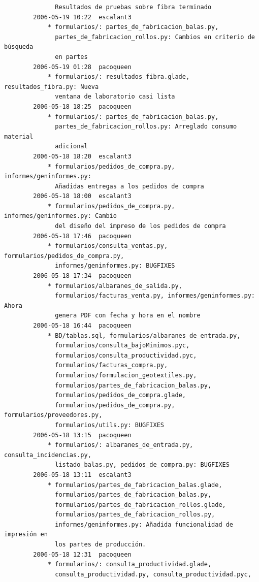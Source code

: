 \documentclass[a4paper]{article}
\begin{document}
\begin{verbatim}
              Resultados de pruebas sobre fibra terminado
        2006-05-19 10:22  escalant3
            * formularios/: partes_de_fabricacion_balas.py,
              partes_de_fabricacion_rollos.py: Cambios en criterio de búsqueda
              en partes
        2006-05-19 01:28  pacoqueen
            * formularios/: resultados_fibra.glade, resultados_fibra.py: Nueva
              ventana de laboratorio casi lista
        2006-05-18 18:25  pacoqueen
            * formularios/: partes_de_fabricacion_balas.py,
              partes_de_fabricacion_rollos.py: Arreglado consumo material
              adicional
        2006-05-18 18:20  escalant3
            * formularios/pedidos_de_compra.py, informes/geninformes.py:
              Añadidas entregas a los pedidos de compra
        2006-05-18 18:00  escalant3
            * formularios/pedidos_de_compra.py, informes/geninformes.py: Cambio
              del diseño del impreso de los pedidos de compra
        2006-05-18 17:46  pacoqueen
            * formularios/consulta_ventas.py, formularios/pedidos_de_compra.py,
              informes/geninformes.py: BUGFIXES
        2006-05-18 17:34  pacoqueen
            * formularios/albaranes_de_salida.py,
              formularios/facturas_venta.py, informes/geninformes.py: Ahora
              genera PDF con fecha y hora en el nombre
        2006-05-18 16:44  pacoqueen
            * BD/tablas.sql, formularios/albaranes_de_entrada.py,
              formularios/consulta_bajoMinimos.pyc,
              formularios/consulta_productividad.pyc,
              formularios/facturas_compra.py,
              formularios/formulacion_geotextiles.py,
              formularios/partes_de_fabricacion_balas.py,
              formularios/pedidos_de_compra.glade,
              formularios/pedidos_de_compra.py, formularios/proveedores.py,
              formularios/utils.py: BUGFIXES
        2006-05-18 13:15  pacoqueen
            * formularios/: albaranes_de_entrada.py, consulta_incidencias.py,
              listado_balas.py, pedidos_de_compra.py: BUGFIXES
        2006-05-18 13:11  escalant3
            * formularios/partes_de_fabricacion_balas.glade,
              formularios/partes_de_fabricacion_balas.py,
              formularios/partes_de_fabricacion_rollos.glade,
              formularios/partes_de_fabricacion_rollos.py,
              informes/geninformes.py: Añadida funcionalidad de impresión en
              los partes de producción.
        2006-05-18 12:31  pacoqueen
            * formularios/: consulta_productividad.glade,
              consulta_productividad.py, consulta_productividad.pyc,

\end{verbatim}
\end{document}
